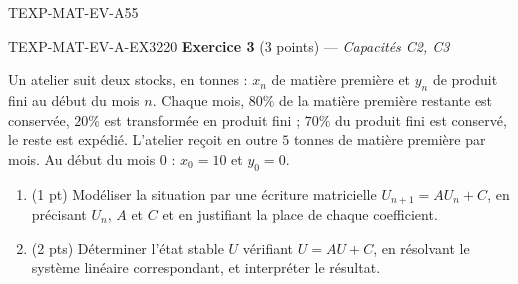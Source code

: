 \begin{evaluation}{TEXP-MAT-EV-A}{55}
\begin{exercice}{TEXP-MAT-EV-A-EX3}{2}{20}
\textbf{Exercice 3} (3 points) --- \textit{Capacités C2, C3}

\medskip

Un atelier suit deux stocks, en tonnes : $x_n$ de matière première et $y_n$ de produit fini au début du mois $n$. Chaque mois, $80\%$ de la matière première restante est conservée, $20\%$ est transformée en produit fini ; $70\%$ du produit fini est conservé, le reste est expédié. L'atelier reçoit en outre $5$ tonnes de matière première par mois. Au début du mois $0$ : $x_0=10$ et $y_0=0$.

\begin{enumerate}
  \item (1 pt) Modéliser la situation par une écriture matricielle $U_{n+1}=AU_n+C$, en précisant $U_n$, $A$ et $C$ et en justifiant la place de chaque coefficient.
  \item (2 pts) Déterminer l'état stable $U$ vérifiant $U=AU+C$, en résolvant le système linéaire correspondant, et interpréter le résultat.
\end{enumerate}
\end{exercice}

\end{evaluation}
